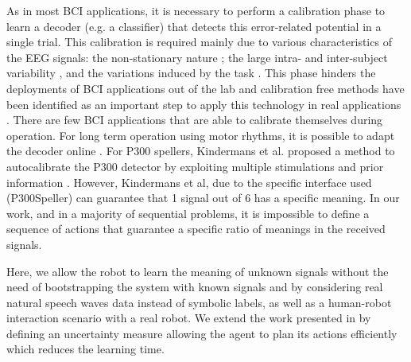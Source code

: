 As in most BCI applications, it is necessary to perform a calibration phase to learn a decoder (e.g. a classifier) that detects this error-related potential in a single trial. This calibration is required mainly due to various characteristics of the EEG signals: the non-stationary nature \cite{vidaurre11}; the large intra- and inter-subject variability \cite{Polich1997}, and the variations induced by the task \cite{iturrate2013task}. This phase hinders the deployments of BCI applications out of the lab and calibration free methods have been identified as an important step to apply this technology in real applications \cite{millan10}. 
There are few BCI applications that are able to calibrate themselves during operation.  For long term operation using motor rhythms, it is possible to adapt the decoder online \cite{vidaurre2010towards}. For P300 spellers, Kindermans et al. proposed a method to autocalibrate the P300 detector by exploiting multiple stimulations and prior information \cite{Kindermans2012a,Kindermans2012b}. However, Kindermans et al, due to the specific interface used (P300Speller) can guarantee that 1 signal out of 6 has a specific meaning. In our work, and in a majority of sequential problems, it is impossible to define a sequence of actions that guarantee a specific ratio of meanings in the received signals.

Here, we allow the robot to learn the meaning of unknown signals without the need of bootstrapping the system with known signals and by considering real natural speech waves data instead of symbolic labels, as well as a human-robot interaction scenario with a real robot. We extend the work presented in \cite{grizou2013robot} by defining an uncertainty measure allowing the agent to plan its actions efficiently which reduces the learning time.
